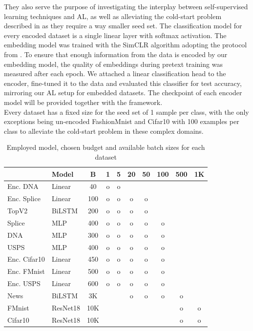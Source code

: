 \documentclass[]{article}
\begin{document}
They also serve the purpose of investigating the interplay between self-supervised learning techniques and AL, as well as alleviating the cold-start problem described in \cite{luth2024navigating} as they require a way smaller seed set.
The classification model for every encoded dataset is a single linear layer with softmax activation.
The embedding model was trained with the SimCLR \cite{chen2020simple} algorithm adopting the protocol from \cite{hacohen2022active}. 
To ensure that enough information from the data is encoded by our embedding model, the quality of embeddings during pretext training was measured after each epoch.
We attached a linear classification head to the encoder, fine-tuned it to the data and evaluated this classifier for test accuracy, mirroring our AL setup for embedded datasets. 
The checkpoint of each encoder model will be provided together with the framework. \\ [1mm]
Every dataset has a fixed size for the seed set of 1 sample per class, with the only exceptions being un-encoded FashionMnist and Cifar10 with 100 examples per class to alleviate the cold-start problem in these complex domains. 

\begin{table}
    \vspace{-0.7cm}
    \caption{Employed model, chosen budget and available batch sizes for each dataset}
    \vspace{0.1cm}
    \label{tab:batch_sizes}
    {\scriptsize
    \begin{tabular}{l|l|c|c|c|c|c|c|c|c}
                    & Model  & B & 1 & 5 & 20 & 50 & 100 & 500 & 1K \\
        \hline
        Enc. DNA    & Linear & 40 & o & o &&&&& \\
        Enc. Splice & Linear & 100 & o & o & o & o &&&\\
        TopV2       & BiLSTM & 200 & o & o & o & o &&& \\
        Splice      & MLP    & 400 & o & o & o & o & o && \\
        DNA         & MLP    & 300 & o & o & o & o & o && \\
        USPS        & MLP    & 400 & o & o & o & o & o && \\
        Enc. Cifar10& Linear & 450 & o & o & o & o & o && \\
        Enc. FMnist & Linear & 500 & o & o & o & o & o && \\
        Enc. USPS   & Linear & 600 & o & o & o & o & o && \\
        News        & BiLSTM & 3K &&& o & o & o & o &\\
        FMnist      & ResNet18& 10K &&&&&& o & o\\
        Cifar10     & ResNet18& 10K &&&&&& o & o \\
    \end{tabular}
	}
    \vspace{-0.85cm}
\end{table}
\end{document}
